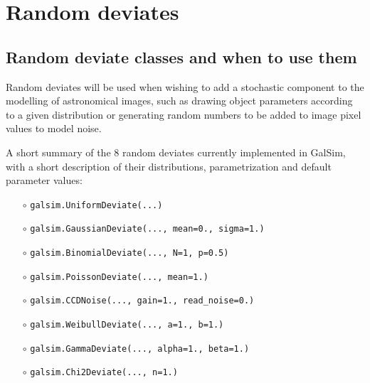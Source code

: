 \documentclass[preprint,11pt]{aastex}
\begin{document}
\section{Random deviates}\label{sect:random}
\subsection{Random deviate classes and when to use them}
Random deviates will be used when wishing to add a stochastic
component to the modelling of astronomical images, such as drawing
object parameters according to a given distribution or generating random
numbers to be added to image pixel values to model noise. 

A short summary of the 8 random deviates currently implemented in GalSim,
with a short description of their distributions, parametrization and
default parameter values:
\begin{itemize}

\item[$\circ$] \texttt{galsim.UniformDeviate(...)} \newline {uniform distribution in the
  interval $[0, 1)$.}

\item[$\circ$] \texttt{galsim.GaussianDeviate(..., mean=0., sigma=1.)} 

\item[$\circ$] \texttt{galsim.BinomialDeviate(..., N=1, p=0.5)} 

\item[$\circ$] \texttt{galsim.PoissonDeviate(..., mean=1.)} 

\item[$\circ$] \texttt{galsim.CCDNoise(..., gain=1., read\_noise=0.)}  

\item[$\circ$] \texttt{galsim.WeibullDeviate(..., a=1., b=1.)} 

\item[$\circ$] \texttt{galsim.GammaDeviate(..., alpha=1., beta=1.)} 

\item[$\circ$] \texttt{galsim.Chi2Deviate(..., n=1.)} 

\end{itemize}
\end{document}
